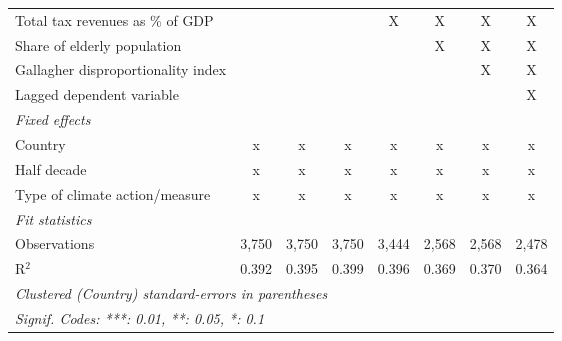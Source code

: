 \begin{tabular}{lccccccc}
   Total tax revenues as \% of GDP                                                    &                &                &                & X              & X             & X             & X\\  
   Share of elderly population                                                        &                &                &                &                & X             & X             & X\\  
   Gallagher disproportionality index                                                 &                &                &                &                &               & X             & X\\  
   Lagged dependent variable                                                          &                &                &                &                &               &               & X\\  
   \emph{Fixed effects}\\
   Country                                                                            & x              & x              & x              & x              & x             & x             & x\\  
   Half decade                                                                        & x              & x              & x              & x              & x             & x             & x\\  
   Type of climate action/measure                                                     & x              & x              & x              & x              & x             & x             & x\\  
   \midrule \emph{Fit statistics}\\
   Observations                                                                       & 3,750          & 3,750          & 3,750          & 3,444          & 2,568         & 2,568         & 2,478\\  
   R$^2$                                                                              & 0.392          & 0.395          & 0.399          & 0.396          & 0.369         & 0.370         & 0.364\\  
   \midrule
   \multicolumn{8}{l}{\emph{Clustered (Country) standard-errors in parentheses}}\\
   \multicolumn{8}{l}{\emph{Signif. Codes: ***: 0.01, **: 0.05, *: 0.1}}\\
\end{tabular}
\par\endgroup


